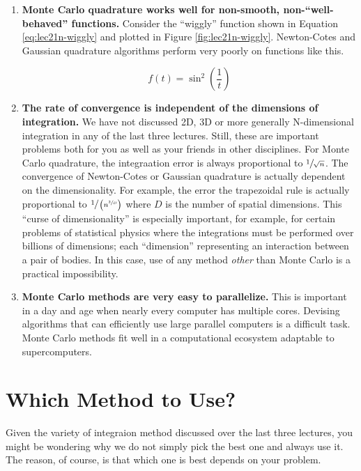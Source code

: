 \begin{enumerate}
\item \textbf{Monte Carlo quadrature works well for non-smooth, non-``well-behaved'' functions.}  Consider the ``wiggly'' function shown in Equation \ref{eq:lec21n-wiggly} and plotted in Figure \ref{fig:lec21n-wiggly}.  Newton-Cotes and Gaussian quadrature algorithms perform very poorly on functions like this.    

\begin{equation}
f(t) = \sin^2{\left(\frac{1}{t} \right)}
\label{eq:lec21n-wiggly}
\end{equation}

\item \textbf{The rate of convergence is independent of the dimensions of integration.} We have not discussed 2D, 3D or more generally N-dimensional integration in any of the last three lectures.  Still, these are important problems both for you as well as your friends in other disciplines.  For Monte Carlo quadrature, the integraation error is always proportional to $\sfrac{1}{\sqrt{n}}$.  The convergence of Newton-Cotes or Gaussian quadrature is actually dependent on the dimensionality.  For example, the error the trapezoidal rule is actually proportional to $\sfrac{1}{\left(n^{\sfrac{2}{D}}\right)}$ where $D$ is the number of spatial dimensions.  This ``curse of dimensionality'' is especially important, for example, for certain problems of statistical physics where the integrations must be performed over billions of dimensions; each ``dimension'' representing an interaction between a pair of bodies.  In this case, use of any method \emph{other} than Monte Carlo is a practical impossibility.

\item \textbf{Monte Carlo methods are very easy to parallelize.} This is important in a day and age when nearly every computer has multiple cores.  Devising algorithms that can efficiently use large parallel computers is a difficult task.  Monte Carlo methods fit well in a computational ecosystem adaptable to supercomputers.

\end{enumerate}

\section{Which Method to Use?}
Given the variety of integraion method discussed over the last three lectures, you might be wondering why we do not simply pick the best one and always use it.  The reason, of course, is that which one is best depends on your problem.  

